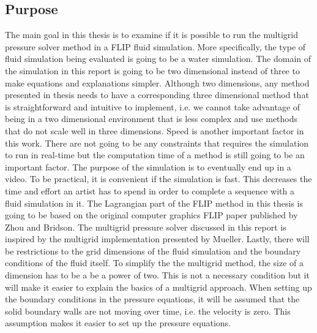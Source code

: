 \subsection{Purpose}

The main goal in this thesis is to examine if it is possible to run the multigrid pressure solver method in a FLIP fluid simulation. More specifically, the type of fluid simulation being evaluated is going to be a water simulation. The domain of the simulation in this report is going to be two dimensional instead of three to make equations and explanations simpler. Although two dimensions, any method presented in thesis needs to have a corresponding three dimensional method that is straightforward and intuitive to implement, i.e. we cannot take advantage of being in a two dimensional environment that is less complex and use methods that do not scale well in three dimensions. 
\newline
\newline 
Speed is another important factor in this work. There are not going to be any constraints that requires the simulation to run in real-time but the computation time of a method is still going to be an important factor. The purpose of the simulation is to eventually end up in a video. To be practical, it is convenient if the simulation is fast. This decreases the time and effort an artist has to spend in order to complete a sequence with a fluid simulation in it.
\newline
\newline
The Lagrangian part of the FLIP method in this thesis is going to be based on the original computer graphics FLIP paper published by Zhou and Bridson\cite{zhu}. The multigrid pressure solver discussed in this report is inspired by the multigrid implementation presented by Mueller\cite{mueller}.
\newline
\newline
Lastly, there will be restrictions to the grid dimensions of the fluid simulation and the boundary conditions of the fluid itself. To simplify the the multigrid method, the size of a dimension has to be a be a power of two. This is not a necessary condition but it will make it easier to explain the basics of a multigrid approach. When setting up the boundary conditions in the pressure equations, it will be assumed that the solid boundary walls are not moving over time, i.e. the velocity is zero. This assumption makes it easier to set up the pressure equations.
